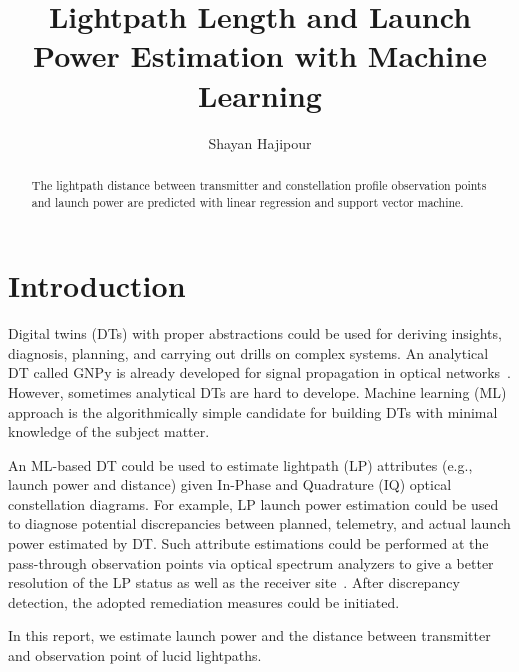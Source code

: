 \documentclass[lettersize,journal, one-column]{IEEEtran}
\begin{document}
\title{Lightpath Length and Launch Power Estimation with Machine Learning}

\author{Shayan Hajipour}


\maketitle

\begin{abstract}
The lightpath distance between transmitter and constellation profile observation points and launch power are predicted with linear regression and support vector machine.
\end{abstract}

\section{Introduction}
\label{section:introduction}
Digital twins (DTs) with proper abstractions could be used for deriving insights, diagnosis, planning, and carrying out drills on complex systems.
An analytical DT called GNPy is already developed for signal propagation in optical networks~\cite{gnpy}.
However, sometimes analytical DTs are hard to develope.
Machine learning (ML) approach is the algorithmically simple candidate for building DTs with minimal knowledge of the subject matter.

An ML-based DT could be used to estimate lightpath (LP) attributes (e.g., launch power and distance) given In-Phase and Quadrature (IQ) optical constellation diagrams.
For example, LP launch power estimation could be used to diagnose potential discrepancies between planned, telemetry, and actual launch power estimated by DT. 
Such attribute estimations could be performed at the pass-through observation points via optical spectrum analyzers to give a better resolution of the LP status as well as the receiver site~\cite{9761942}.
After discrepancy detection, the adopted remediation measures could be initiated.

In this report, we estimate launch power and the distance between transmitter and observation point of lucid lightpaths.
\end{document}
